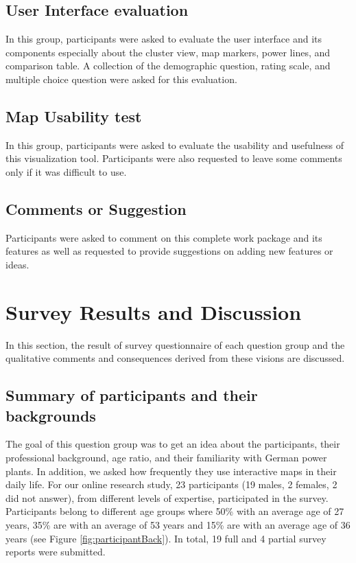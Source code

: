 \subsection*{User Interface evaluation}
\label{sssec:uiEval}

In this group, participants were asked to evaluate the user interface and its components especially about the cluster view, map markers, power lines, and comparison table. A collection of the demographic question, rating scale, and multiple choice question were asked for this evaluation. 

\subsection*{Map Usability test}
\label{sssec:MUtest}

In this group, participants were asked to evaluate the usability and usefulness of this visualization tool. Participants were also requested to leave some comments only if it was difficult to use. 

\subsection*{Comments or Suggestion}
\label{sssec:cORS}

Participants were asked to comment on this complete work package and its features as well as requested to provide suggestions on adding new features or ideas.  

\section{Survey Results and Discussion}

In this section, the result of survey questionnaire of each question group and the qualitative comments and consequences derived from these visions are discussed. 

\subsection{Summary of participants and their backgrounds}

The goal of this question group was to get an idea about the participants, their professional background, age ratio, and their familiarity with German power plants. In addition, we asked how frequently they use interactive maps in their daily life. For our online research study, 23 participants (19 males, 2 females, 2 did not answer), from different levels of expertise, participated in the survey. Participants belong to different age groups where 50\% with an average age of 27 years, 35\% are with an average of 53 years and 15\% are with an average age of 36 years (see Figure \ref{fig:participantBack}). In total, 19 full and 4 partial survey reports were submitted. 

